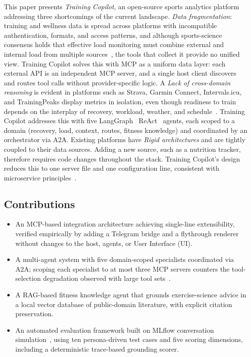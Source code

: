 This paper presents \textit{Training Copilot}, an open-source sports analytics platform addressing three shortcomings of the current landscape. \textit{Data fragmentation}: training and wellness data is spread across platforms with incompatible authentication, formats, and access patterns, and although sports-science consensus holds that effective load monitoring must combine external and internal load from multiple sources~\citep{bourdon_monitoring_2017, halson_monitoring_2014}, the tools that collect it provide no unified view. Training Copilot solves this with MCP as a uniform data layer: each external API is an independent MCP server, and a single host client discovers and routes tool calls without provider-specific logic. A \textit{Lack of cross-domain reasoning} is evident in platforms such as Strava, Garmin Connect, Intervals.icu, and TrainingPeaks display metrics in isolation, even though readiness to train depends on the interplay of recovery, workload, weather, and schedule~\citep{bourdon_monitoring_2017, gabbett_training_2016}. Training Copilot addresses this with five LangGraph~\citep{langchain_langgraph_2024} ReAct~\citep{yao_react_2023} agents, each scoped to a domain (recovery, load, context, routes, fitness knowledge) and coordinated by an orchestrator via A2A. Existing platforms have \textit{Rigid architectures} and are tightly coupled to their data sources. Adding a new source, such as a nutrition tracker, therefore requires code changes throughout the stack. Training Copilot's design reduces this to one server file and one configuration line, consistent with microservice principles~\citep{dragoni_microservices_2017}.

\subsection{Contributions}\label{sec:intro:contributions}

\begin{itemize}
\item An MCP-based integration architecture achieving single-line extensibility, verified empirically by adding a Telegram bridge and a flythrough renderer without changes to the host, agents, or User Interface (UI).
\item A multi-agent system with five domain-scoped specialists coordinated via A2A; scoping each specialist to at most three MCP servers counters the tool-selection degradation observed with large tool sets~\citep{qu_tool_2024}.
\item A RAG-based fitness knowledge agent that grounds exercise-science advice in a local vector database of public-domain literature, with explicit citation preservation.
\item An automated evaluation framework built on MLflow conversation simulation~\citep{mlflow_multiturn_2025}, using ten persona-driven test cases and five scoring dimensions, including a deterministic trace-based grounding scorer.
\end{itemize}

